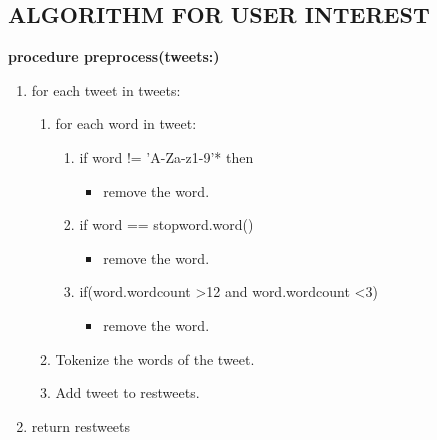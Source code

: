\subsection{ALGORITHM FOR USER INTEREST}

\textbf{procedure preprocess(tweets:)}
\begin{enumerate}
    \item for each tweet in tweets:
    \begin{enumerate}
     \item for each word in tweet:
      \begin{enumerate}
          \item if word != 'A-Za-z1-9'* then
          \begin{itemize}
              \item remove the word.
          \end{itemize}
          \item if word == stopword.word()
          \begin{itemize}
              \item remove the word.
          \end{itemize}
          \item if(word.wordcount >12 and word.wordcount <3)
           \begin{itemize}
              \item remove the word.
          \end{itemize}
          
          
      \end{enumerate}
     \item Tokenize the words of the tweet.
     \item Add tweet to restweets.
    \end{enumerate}
    
    \item return restweets
\end{enumerate}
\paragraph{}

